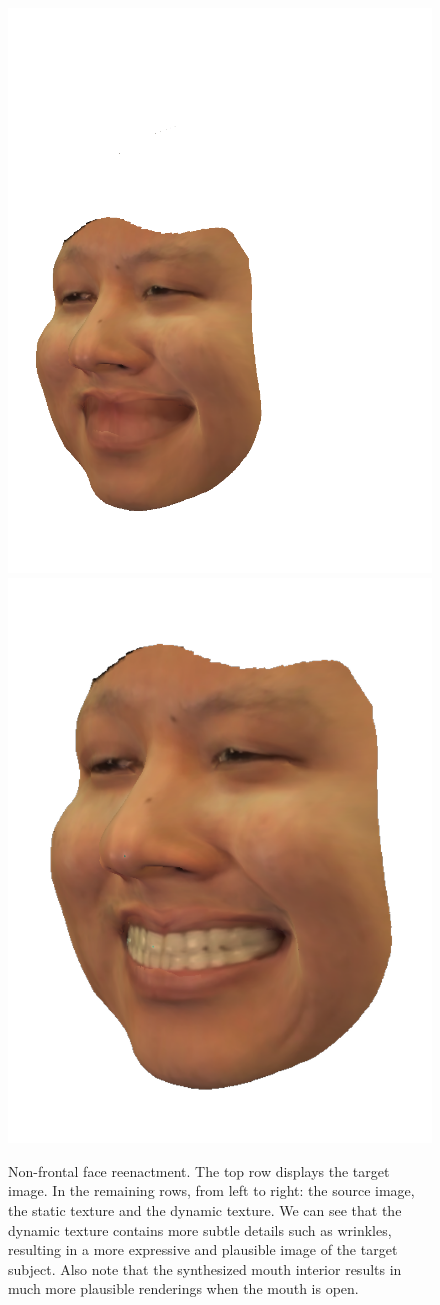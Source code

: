 \documentclass[10pt,twocolumn,letterpaper]{article}
\begin{document}
\begin{figure}[th]
\begin{center}
  \includegraphics[width=0.32\columnwidth]{figures/kylehao_transfer/static_000066.png}
  \includegraphics[width=0.32\columnwidth]{figures/kylehao_transfer/dynamic_000066.png}
\end{center}
   \caption{Non-frontal face reenactment. The top row displays the target image. In the remaining rows, from left to right: the source image, the static texture and the dynamic texture. We can see that the dynamic texture contains more subtle details such as wrinkles, resulting in a more expressive and plausible image of the target subject. Also note that the synthesized mouth interior results in much more plausible renderings when the mouth is open.}
   \vspace{-0.05in}
\label{replaceres}
\end{figure}
\end{document}
